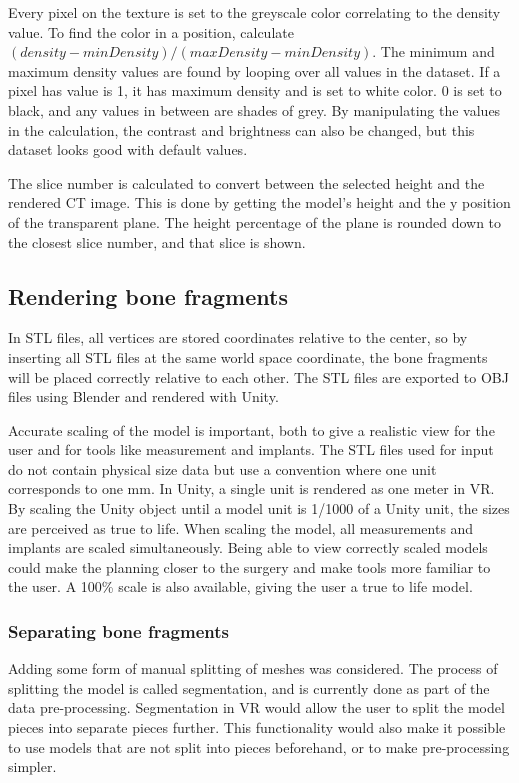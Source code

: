 \documentclass[a4paper]{report}
\begin{document}
Every pixel on the texture is set to the greyscale color correlating to the density value. To find the color in a position, calculate $(density-minDensity)/(maxDensity-minDensity)$. The minimum and maximum density values are found by looping over all values in the dataset.
If a pixel has value is 1, it has maximum density and is set to white color. 0 is set to black, and any values in between are shades of grey.
By manipulating the values in the calculation, the contrast and brightness can also be changed, but this dataset looks good with default values.


The slice number is calculated to convert between the selected height and the rendered CT image. This is done by getting the model's height and the y position of the transparent plane. The height percentage of the plane is rounded down to the closest slice number, and that slice is shown.

\subsection{Rendering bone fragments}
In STL files, all vertices are stored coordinates relative to the center, so by inserting all STL files at the same world space coordinate, the bone fragments will be placed correctly relative to each other. The STL files are exported to OBJ files using Blender and rendered with Unity.

Accurate scaling of the model is important, both to give a realistic view for the user and for tools like measurement and implants. The STL files used for input do not contain physical size data but use a convention where one unit corresponds to one mm. In Unity, a single unit is rendered as one meter in VR. By scaling the Unity object until a model unit is 1/1000 of a Unity unit, the sizes are perceived as true to life. When scaling the model, all measurements and implants are scaled simultaneously.
Being able to view correctly scaled models could make the planning closer to the surgery and make tools more familiar to the user. A 100\% scale is also available, giving the user a true to life model.

\subsubsection{Separating bone fragments}
Adding some form of manual splitting of meshes was considered. The process of splitting the model is called segmentation, and is currently done as part of the data pre-processing. Segmentation in VR would allow the user to split the model pieces into separate pieces further. This functionality would also make it possible to use models that are not split into pieces beforehand, or to make pre-processing simpler.
\end{document}
